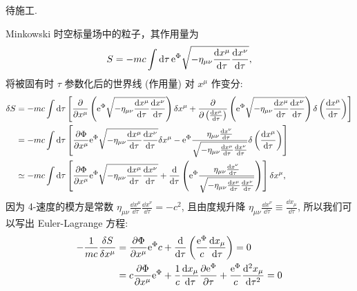 \problem{}
\begin{solution}
    待施工.
\end{solution}



\begin{solution}
    Minkowski 时空标量场中的粒子，其作用量为
    \[
        S = - m c \int \dd \tau \,\mathrm e^{\Phi} \sqrt{- \eta_{\mu \nu} \frac{\dd x^\mu}{\dd \tau} \frac{\dd x^\nu}{\dd \tau}},
    \]
    将被固有时 $\tau$ 参数化后的世界线 (作用量) 对 $x^\mu$ 作变分:
    \begin{align*}
        \delta S &= - mc \int \dd \tau \left[\frac{\partial}{\partial x^\mu} \left(\mathrm e^{\Phi} \sqrt{- \eta_{\mu \nu} \frac{\dd x^\mu}{\dd \tau} \frac{\dd x^\nu}{\dd \tau}}\right) \delta x^\mu + \frac{\partial}{\partial \left(\frac{\dd x^\mu}{\dd \tau}\right)} \left(\mathrm e^{\Phi} \sqrt{- \eta_{\mu \nu} \frac{\dd x^\mu}{\dd \tau} \frac{\dd x^\nu}{\dd \tau}}\right)\delta \left(\frac{\dd x^\mu}{\dd \tau}\right)\right]  \\
        &= - mc \int \dd \tau \left[\frac{\partial \Phi}{\partial x^\mu} \mathrm e^{\Phi} \sqrt{- \eta_{\mu \nu} \frac{\dd x^\mu}{\dd \tau} \frac{\dd x^\nu}{\dd \tau}} \delta x^\mu - \mathrm e^{\Phi} \frac{\eta_{\mu \nu} \frac{\dd x^\nu}{\dd \tau}}{\sqrt{- \eta_{\mu \nu} \frac{\dd x^\mu}{\dd \tau} \frac{\dd x^\nu}{\dd \tau}}} \delta \left(\frac{\dd x^\mu}{\dd \tau}\right)\right] \\
        & \simeq -mc \int \dd \tau \left[\frac{\partial \Phi}{\partial x^\mu} \mathrm e^{\Phi} \sqrt{- \eta_{\mu \nu} \frac{\dd x^\mu}{\dd \tau} \frac{\dd x^\nu}{\dd \tau}} + \frac{\dd}{\dd \tau} \left(\mathrm e^{\Phi} \frac{\eta_{\mu \nu} \frac{\dd x^\nu}{\dd \tau}}{\sqrt{- \eta_{\mu \nu} \frac{\dd x^\mu}{\dd \tau} \frac{\dd x^\nu}{\dd \tau}}}\right) \right] \delta x^\mu,
    \end{align*}
    因为 4-速度的模方是常数 $\eta_{\mu \nu} \frac{\dd x^\mu}{\dd \tau} \frac{\dd x^\nu}{\dd \tau} = - c^2$, 且由度规升降 $\eta_{\mu \nu} \frac{\dd x^\nu}{\dd \tau} \equiv \frac{\dd x_\mu}{\dd \tau}$, 所以我们可以写出 Euler-Lagrange 方程:
    \begin{align*}
        - \frac{1}{mc} \frac{\delta S}{\delta x^\mu} &= \frac{\pp \Phi}{\pp x^\mu} \me^\Phi c + \frac{\dd}{\dd \tau} \left(\frac{\me^\Phi}{c} \frac{\dd x_\mu}{\dd \tau}\right) = 0 \\
        &= c \frac{\pp \Phi}{\pp x^\mu} \me^\Phi + \frac{1}{c} \frac{\dd x_\mu}{\dd \tau} \frac{\pp \me^\Phi}{\pp \tau} + \frac{\me^\Phi}{c} \frac{\dd^2 x_\mu}{\dd \tau^2} = 0 \\

\end{align*}
\end{solution}
